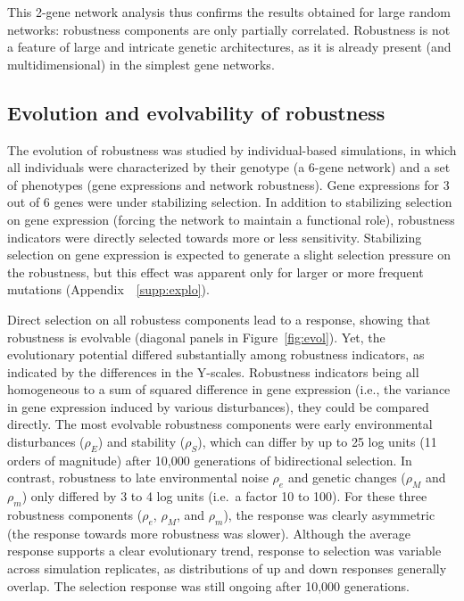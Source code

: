 \documentclass[10pt,a4paper]{article}
\newcommand{\stability}{{\rho_S}}
\newcommand{\earlyenv}{{\rho_E}}
\newcommand{\lateenv}{{\rho_e}}
\newcommand{\earlymut}{{\rho_M}}
\newcommand{\latemut}{{\rho_m}}
\newcommand{\SupMat}{Appendix~}
\begin{document}
This 2-gene network analysis thus confirms the results obtained for large random networks: robustness components are only partially correlated. Robustness is not a feature of large and intricate genetic architectures, as it is already present (and multidimensional) in the simplest gene networks. 

\subsection{Evolution and evolvability of robustness}

The evolution of robustness was studied by individual-based simulations, in which all individuals were characterized by their genotype (a 6-gene network) and a set of phenotypes (gene expressions and network robustness). Gene expressions for 3 out of 6 genes were under stabilizing selection. In addition to stabilizing selection on gene expression (forcing the network to maintain a functional role), robustness indicators were directly selected towards more or less sensitivity. Stabilizing selection on gene expression is expected to generate a slight selection pressure on the robustness, but this effect was apparent only for larger or more frequent mutations (\SupMat~\ref{supp:explo}). 

Direct selection on all robustess components lead to a response, showing that robustness is evolvable (diagonal panels in Figure~\ref{fig:evol}). Yet, the evolutionary potential differed substantially among robustness indicators, as indicated by the differences in the Y-scales. Robustness indicators being all homogeneous to a sum of squared difference in gene expression (i.e., the variance in gene expression induced by various disturbances), they could be compared directly. The most evolvable robustness components were early environmental disturbances ($\earlyenv$) and stability ($\stability$), which can differ by up to 25 log units (11 orders of magnitude) after 10,000 generations of bidirectional selection. In contrast, robustness to late environmental noise $\lateenv$ and genetic changes ($\earlymut$ and $\latemut$) only differed by 3 to 4 log units (i.e.\ a factor 10 to 100). For these three robustness components ($\lateenv$, $\earlymut$, and $\latemut$), the response was clearly asymmetric (the response towards more robustness was slower). Although the average response supports a clear evolutionary trend, response to selection was variable across simulation replicates, as distributions of up and down responses generally overlap. The selection response was still ongoing after 10,000 generations. 
\end{document}
